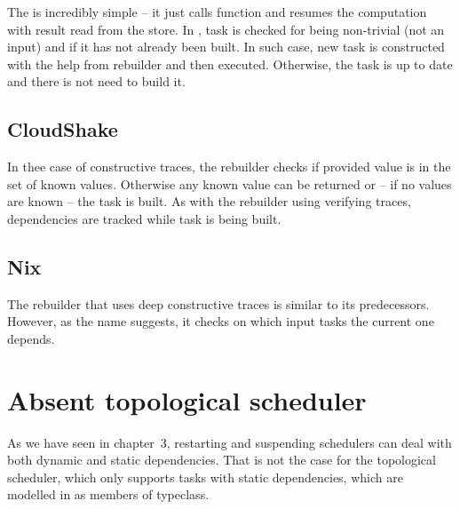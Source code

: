 

The  is incredibly simple -- it just calls  function and resumes the computation with result read from the store. In , task is checked for being non-trivial (not an input) and if it has not already been built. In such case, new task is constructed with the help from rebuilder and then executed. Otherwise, the task is up to date and there is not need to build it.

\subsection{CloudShake}





In thee case of constructive traces, the rebuilder checks if provided value is in the set of known values. Otherwise any known value can be returned or -- if no values are known -- the task is built. As with the rebuilder using verifying traces, dependencies are tracked while task is being built.


\subsection{Nix}



The rebuilder that uses deep constructive traces is similar to its predecessors. However, as the name suggests, it checks on which input tasks the current one depends.




\section{Absent topological scheduler}

As we have seen in chapter~3, restarting and suspending schedulers can deal with both dynamic and static dependencies. That is not the case for the topological scheduler, which only supports tasks with static dependencies, which are modelled in \BSaLC{} as members of  typeclass.

